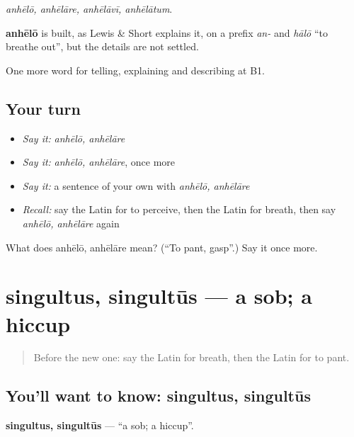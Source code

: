 \emph{anhēlō, anhēlāre, anhēlāvī, anhēlātum}.

\begin{cousinweb}
\textbf{anhēlō} is built, as Lewis \& Short explains it, on a prefix \emph{an-} and \emph{hālō} \textquotedblleft{}to breathe out\textquotedblright{}, but the details are not settled.
\end{cousinweb}

\begin{grammarlens}[title={What you've built}]
One more word for telling, explaining and describing at B1.
\end{grammarlens}

\subsection*{Your turn}
\begin{itemize}
\raggedright
  \item \emph{Say it:} \emph{anhēlō, anhēlāre}
  \item \emph{Say it:} \emph{anhēlō, anhēlāre}, once more
  \item \emph{Say it:} a sentence of your own with \emph{anhēlō, anhēlāre}
  \item \emph{Recall:} say the Latin for to perceive, then the Latin for breath, then say \emph{anhēlō, anhēlāre} again
\end{itemize}

\begin{tcolorbox}[breakable,colback=teal!4,colframe=teal!35!black,title={Before you move on}]
What does anhēlō, anhēlāre mean? (\textquotedblleft{}To pant, gasp\textquotedblright{}.) Say it once more.
\end{tcolorbox}
\section[singultus, singultūs]{singultus, singultūs — a sob; a hiccup}

\label{lesson:LA-C520-singultus}



\begin{quote}
Before the new one: say the Latin for breath, then the Latin for to pant.
\end{quote}

\subsection*{You'll want to know: singultus, singultūs}
\textbf{singultus, singultūs} — \textquotedblleft{}a sob; a hiccup\textquotedblright{}.

